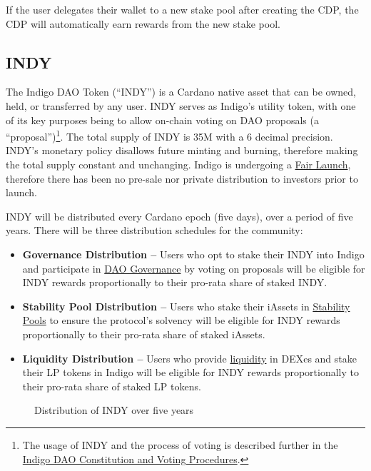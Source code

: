 \documentclass{article}
\begin{document}
\begin{sloppypar}
If the user delegates their wallet to a new stake pool after creating
the CDP, the CDP will automatically earn rewards from the new stake
pool.

\filbreak

\hypertarget{indy}{%
\subsection{INDY}\label{indy}}

The Indigo DAO Token (``INDY'') is a Cardano native asset that can be
owned, held, or transferred by any user. INDY serves as Indigo's utility
token, with one of its key purposes being to allow on-chain voting on
DAO proposals (a ``proposal'')\footnote{The usage of INDY and the
  process of voting is described further in the
  \href{https://github.com/IndigoProtocol/indigo-dao}{Indigo DAO
  Constitution and Voting Procedures}.}. The total supply of INDY is 35M
with a 6 decimal precision. INDY's monetary policy disallows future
minting and burning, therefore making the total supply constant and
unchanging. Indigo is undergoing a \protect\hyperlink{fair-launch}{Fair
Launch}, therefore there has been no pre-sale nor private distribution
to investors prior to launch.

INDY will be distributed every Cardano epoch (five days), over a period
of five years. There will be three distribution schedules for the
community:

\begin{itemize}
\item
  \textbf{Governance Distribution --} Users who opt to stake their INDY
  into Indigo and participate in \protect\hyperlink{governance}{DAO
  Governance} by voting on proposals will be eligible for INDY rewards
  proportionally to their pro-rata share of staked INDY.
\item
  \textbf{Stability Pool Distribution --} Users who stake their iAssets
  in \protect\hyperlink{stability-pools}{Stability Pools} to ensure the
  protocol's solvency will be eligible for INDY rewards proportionally
  to their pro-rata share of staked iAssets.
\item
  \textbf{Liquidity Distribution --} Users who provide
  \protect\hyperlink{liquidity-staking-rewards}{liquidity} in DEXes and
  stake their LP tokens in Indigo will be eligible for INDY rewards
  proportionally to their pro-rata share of staked LP tokens.
\end{itemize}

\hypertarget{indy-distribution}{%
\begin{figure}[htbp]
\centering

\caption{Distribution of INDY over five years}
\end{figure}}


\end{sloppypar}
\end{document}
